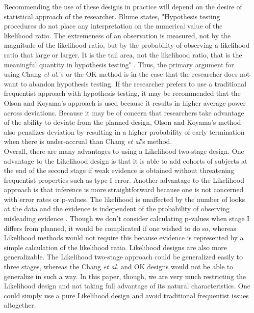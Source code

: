 \documentclass[12pt]{report}\usepackage[]{graphicx}\usepackage[]{color}
\newlength{\li}\setlength{\li}{14.48pt}
\newlength{\di}\setlength{\di}{-3.5mm}
\begin{document}
\indent Recommending the use of these designs in practice will depend on the desire of statistical approach of the researcher. Blume states, "Hypothesis testing procedures do not place any interpretation on the numerical value of the likelihood ratio. The extremeness of an observation is measured, not by the magnitude of the likelihood ratio, but by the probability of observing a likelihood ratio that large or larger. It is the tail area, not the likelihood ratio, that is the meaningful quantity in hypothesis testing" \cite{Blume2002}. Thus, the primary argument for using Chang \textit{et al.}'s or the OK method is in the case that the researcher does not want to abandon hypothesis testing.  If the researcher prefers to use a traditional frequentist approach with hypothesis testing, it may be recommended that the Olson and Koyama's approach is used because it results in higher average power across deviations. Because it may be of concern that researchers take advantage of the ability to deviate from the planned design, Olson and Koyama's method also penalizes deviation by resulting in a higher probability of early termination when there is under-accrual than Chang \textit{et al}'s method. \\
\indent Overall, there are many advantages to using a Likelihood two-stage design. One advantage to the Likelihood design is that it is able to add cohorts of subjects at the end of the second stage if weak evidence is obtained without threatening frequentist properties such as type I error. Another advantage to the Likelihood approach is that inference is more straightforward because one is not concerned with error rates or p-values. The likelihood is unaffected by the number of looks at the data and the evidence is independent of the probability of observing misleading evidence \cite{Blume2002}. Though we don't consider calculating p-values when stage I differs from planned, it would be complicated if one wished to do so, whereas Likelihood methods would not require this because evidence is represented by a simple calculation of the likelihood ratio.  Likelihood designs are also more generalizable. The Likelihood two-stage approach could be generalized easily to three stages, whereas the Chang \textit{et al.} and OK designs would not be able to generalize in such a way. In this paper, though, we are very much restricting the Likelihood design and not taking full advantage of its natural characteristics. One could simply use a pure Likelihood design and avoid traditional frequentist issues altogether. \\
\end{document}
